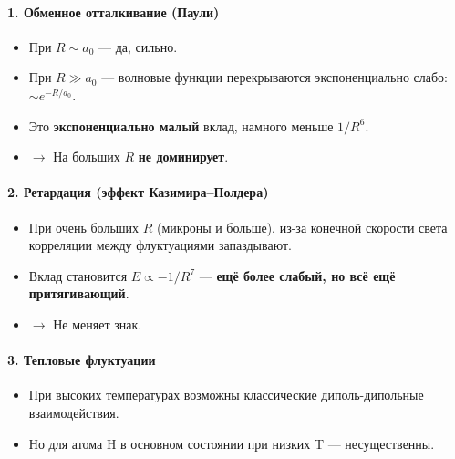 \documentclass[11pt]{article}
\providecommand{\tightlist}{%
      \setlength{\itemsep}{0pt}\setlength{\parskip}{0pt}}
\begin{document}
\paragraph{\texorpdfstring{1. \textbf{Обменное отталкивание
(Паули)}}{1. Обменное отталкивание (Паули)}}\label{ux43eux431ux43cux435ux43dux43dux43eux435-ux43eux442ux442ux430ux43bux43aux438ux432ux430ux43dux438ux435-ux43fux430ux443ux43bux438}

\begin{itemize}
\tightlist
\item
  При \(R \sim a_0\) --- да, сильно.
\item
  При \(R \gg a_0\) --- волновые функции перекрываются экспоненциально
  слабо: \(\sim e^{-R/a_0}\).
\item
  Это \textbf{экспоненциально малый} вклад, намного меньше \(1/R^6\).
\item
  $\rightarrow$ На больших \(R\) \textbf{не доминирует}.
\end{itemize}

\paragraph{\texorpdfstring{2. \textbf{Ретардация (эффект
Казимира--Полдера)}}{2. Ретардация (эффект Казимира--Полдера)}}\label{ux440ux435ux442ux430ux440ux434ux430ux446ux438ux44f-ux44dux444ux444ux435ux43aux442-ux43aux430ux437ux438ux43cux438ux440ux430ux43fux43eux43bux434ux435ux440ux430}

\begin{itemize}
\tightlist
\item
  При очень больших \(R\) (микроны и больше), из-за конечной скорости
  света корреляции между флуктуациями запаздывают.
\item
  Вклад становится \(E \propto -1/R^7\) --- \textbf{ещё более слабый, но
  всё ещё притягивающий}.
\item
  $\rightarrow$ Не меняет знак.
\end{itemize}

\paragraph{\texorpdfstring{3. \textbf{Тепловые
флуктуации}}{3. Тепловые флуктуации}}\label{ux442ux435ux43fux43bux43eux432ux44bux435-ux444ux43bux443ux43aux442ux443ux430ux446ux438ux438}

\begin{itemize}
\tightlist
\item
  При высоких температурах возможны классические диполь-дипольные
  взаимодействия.
\item
  Но для атома H в основном состоянии при низких T --- несущественны.
\end{itemize}
\end{document}
